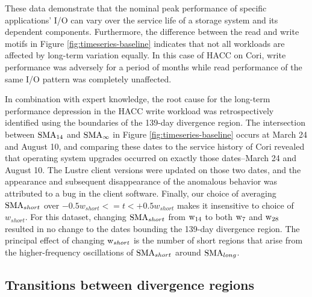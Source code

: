 These data demonstrate that the nominal peak performance of specific applications' I/O can vary over the service life of a storage system and its dependent components.
Furthermore, the difference between the read and write motifs in Figure \ref{fig:timeseries-baseline} indicates that not all workloads are affected by long-term variation equally. 
In this case of HACC on Cori, write performance was adversely for a period of months while read performance of the same I/O pattern was completely unaffected.

In combination with expert knowledge, the root cause for the long-term performance depression in the HACC write workload was retrospectively identified using the boundaries of the 139-day divergence region.
The intersection between $\textup{SMA}_{14}$ and $\textup{SMA}_\infty$ in Figure \ref{fig:timeseries-baseline} occurs at March 24 and August 10, and comparing these dates to the service history of Cori revealed that operating system upgrades occurred on exactly those dates--March 24 and August 10.
The Lustre client versions were updated on those two dates, and the appearance and subsequent disappearance of the anomalous behavior was attributed to a bug in the client software.
Finally, our choice of averaging $\textup{SMA}_{short}$ over ${-0.5w_{short} <= t < +0.5w_{short}}$ makes it insensitive to choice of $w_{short}$.
For this dataset, changing $\textup{SMA}_{short}$ from $\textup{w}_{14}$ to both $\textup{w}_{7}$ and $\textup{w}_{28}$ resulted in no change to the dates bounding the 139-day divergence region.
The principal effect of changing $\textup{w}_{short}$ is the number of short regions that arise from the higher-frequency oscillations of $\textup{SMA}_{short}$ around $\textup{SMA}_{long}$.





\subsection{Transitions between divergence regions} \label{sec:results/transitions}

